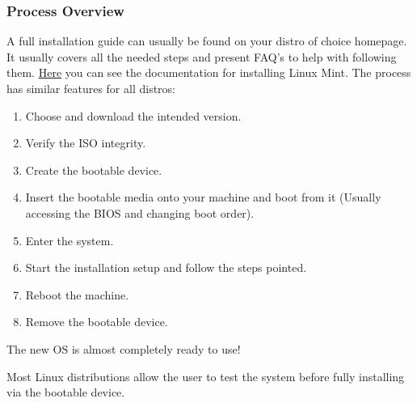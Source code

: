 \documentclass[a4paper,11pt]{article}
\begin{document}
\subsubsection{Process Overview}
A full installation guide can usually be found on your distro of choice
homepage. It usually covers all the needed steps and present FAQ's to help with
following them.
\href{https://linuxmint-installation-guide.readthedocs.io/en/latest/}{Here} 
you can see the documentation for installing Linux Mint.
The process has similar features for all distros:
\begin{enumerate}
    \item Choose and download the intended version.
    \item Verify the ISO integrity.
    \item Create the bootable device.
    \item Insert the bootable media onto your machine and boot from it (Usually
        accessing the BIOS and changing boot order).
    \item Enter the system.
    \item Start the installation setup and follow the steps pointed.
    \item Reboot the machine.
    \item Remove the bootable device.
\end{enumerate}
The new OS is almost completely ready to use!
\begin{tipbox}
Most Linux distributions allow the user to test the system before fully
installing via the bootable device.
\end{tipbox}
\end{document}
